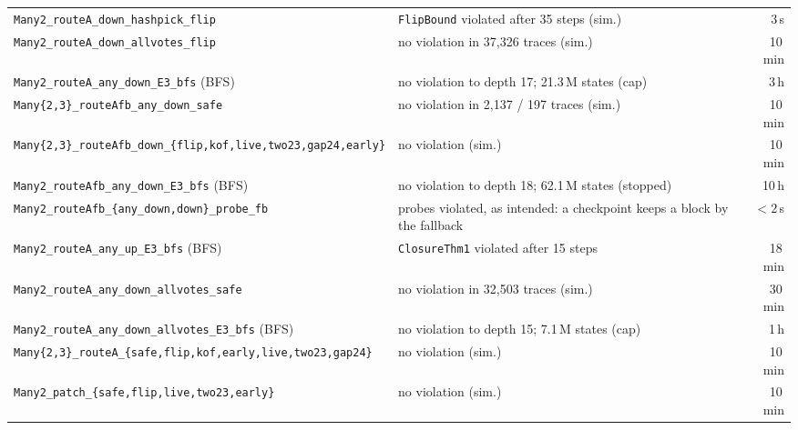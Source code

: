 \documentclass[conference]{IEEEtran}
\begin{document}
\begin{table}[t]
\begin{tabularx}{\textwidth}{@{}>{\raggedright\arraybackslash}p{}Yr@{}}
\texttt{Many2\_\allowbreak{}routeA\_\allowbreak{}down\_\allowbreak{}hashpick\_\allowbreak{}flip} & \texttt{FlipBound} violated after 35 steps (sim.) & 3\,s\\
\texttt{Many2\_\allowbreak{}routeA\_\allowbreak{}down\_\allowbreak{}allvotes\_\allowbreak{}flip} & no violation in 37{,}326 traces (sim.) & 10\,min\\
\texttt{Many2\_\allowbreak{}routeA\_\allowbreak{}any\_\allowbreak{}down\_\allowbreak{}E3\_\allowbreak{}bfs} (BFS) & no violation to depth 17; 21.3\,M states (cap) & 3\,h\\
\texttt{Many\{2,\allowbreak{}3\}\_\allowbreak{}routeAfb\_\allowbreak{}any\_\allowbreak{}down\_\allowbreak{}safe} & no violation in 2{,}137 / 197 traces (sim.) & 10\,min\\
\texttt{Many\{2,\allowbreak{}3\}\_\allowbreak{}routeAfb\_\allowbreak{}down\_\allowbreak{}\{flip,\allowbreak{}kof,\allowbreak{}live,\allowbreak{}two23,\allowbreak{}gap24,\allowbreak{}early\}} & no violation (sim.) & 10\,min\\
\texttt{Many2\_\allowbreak{}routeAfb\_\allowbreak{}any\_\allowbreak{}down\_\allowbreak{}E3\_\allowbreak{}bfs} (BFS) & no violation to depth 18; 62.1\,M states (stopped) & 10\,h\\
\texttt{Many2\_\allowbreak{}routeAfb\_\allowbreak{}\{any\_\allowbreak{}down,\allowbreak{}down\}\_\allowbreak{}probe\_\allowbreak{}fb} & probes violated, as intended: a checkpoint keeps a block by the fallback & $<2$\,s\\
\texttt{Many2\_\allowbreak{}routeA\_\allowbreak{}any\_\allowbreak{}up\_\allowbreak{}E3\_\allowbreak{}bfs} (BFS) & \texttt{ClosureThm1} violated after 15 steps & 18\,min\\
\texttt{Many2\_\allowbreak{}routeA\_\allowbreak{}any\_\allowbreak{}down\_\allowbreak{}allvotes\_\allowbreak{}safe} & no violation in 32{,}503 traces (sim.) & 30\,min\\
\texttt{Many2\_\allowbreak{}routeA\_\allowbreak{}any\_\allowbreak{}down\_\allowbreak{}allvotes\_\allowbreak{}E3\_\allowbreak{}bfs} (BFS) & no violation to depth 15; 7.1\,M states (cap) & 1\,h\\
\texttt{Many\{2,\allowbreak{}3\}\_\allowbreak{}routeA\_\allowbreak{}\{safe,\allowbreak{}flip,\allowbreak{}kof,\allowbreak{}early,\allowbreak{}live,\allowbreak{}two23,\allowbreak{}gap24\}} & no violation (sim.) & 10\,min\\
\texttt{Many2\_\allowbreak{}patch\_\allowbreak{}\{safe,\allowbreak{}flip,\allowbreak{}live,\allowbreak{}two23,\allowbreak{}early\}} & no violation (sim.) & 10\,min\\

\end{tabularx}
\end{table}
\end{document}
